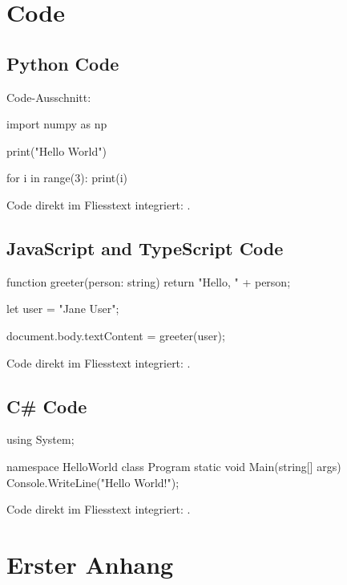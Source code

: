 \documentclass[a4paper,12pt,twoside]{article}
\begin{document}
\newpage
\section{Code}

\subsection{Python Code}

Code-Ausschnitt:

\begin{python}
import numpy as np

print("Hello World")

for i in range(3):
	print(i)
\end{python}

Code direkt im Fliesstext integriert: .

\subsection{JavaScript and TypeScript Code}

\begin{javascript}
function greeter(person: string) {
	return "Hello, " + person;
} 

let user = "Jane User";

document.body.textContent = greeter(user);
\end{javascript}

Code direkt im Fliesstext integriert: .


\subsection{C\# Code}

\begin{csharp}
using System;

namespace HelloWorld
{
  class Program
  {
    static void Main(string[] args)
    {
      Console.WriteLine("Hello World!");    
    }
  }
}
\end{csharp}

Code direkt im Fliesstext integriert: .


\newpage
\appendix

\section{Erster Anhang}
\end{document}
